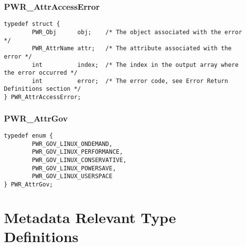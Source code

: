 
\subsubsection{PWR_AttrAccessError}\label{type:AttrAccessError}
\begin{center}
\begin{minipage}{.95\linewidth}%
\begin{lstlisting}
typedef struct {
        PWR_Obj      obj;    /* The object associated with the error */
        PWR_AttrName attr;   /* The attribute associated with the error */
        int          index;  /* The index in the output array where the error occurred */
        int          error;  /* The error code, see Error Return Definitions section */
} PWR_AttrAccessError;
\end{lstlisting}
\end{minipage}
\end{center}


\subsubsection{PWR_AttrGov}\label{type:AttrGov}
\begin{center}
\begin{minipage}{.95\linewidth}%
\begin{lstlisting}
typedef enum {
        PWR_GOV_LINUX_ONDEMAND,
        PWR_GOV_LINUX_PERFORMANCE,
        PWR_GOV_LINUX_CONSERVATIVE,
        PWR_GOV_LINUX_POWERSAVE,
        PWR_GOV_LINUX_USERSPACE
} PWR_AttrGov;
\end{lstlisting}
\end{minipage}
\end{center}


\section{Metadata Relevant Type Definitions}\label{sec:MetadataTypeDefinitions}

